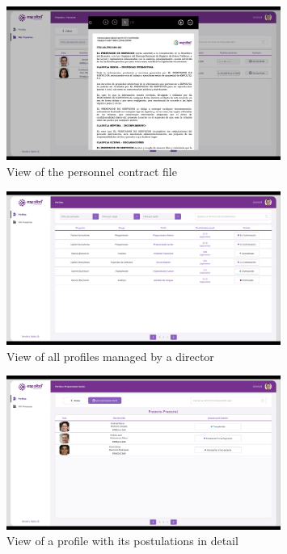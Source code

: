 \documentclass{scrreprt}
\begin{document}
\begin{figure}[H]
	\centering \small
	\includegraphics[width=0.8\textwidth]{WebPrototype/wflow-17.jpeg}
	\caption{View of the personnel contract file}
\end{figure}

\begin{figure}[H]
	\centering \small
	\includegraphics[width=0.8\textwidth]{WebPrototype/wflow-18.jpeg}
	\caption{View of all profiles managed by a director}
\end{figure}

\begin{figure}[H]
	\centering \small
	\includegraphics[width=0.8\textwidth]{WebPrototype/wflow-19.jpeg}
	\caption{View of a profile with its postulations in detail}
\end{figure}
\end{document}
